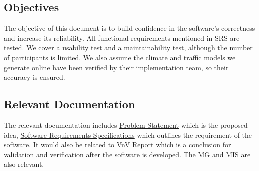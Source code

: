 \documentclass[12pt, titlepage]{article}
\begin{document}
\subsection{Objectives}
The objective of this document is to build confidence in the software's correctness and increase its reliability. All functional requirements mentioned in SRS are tested. We cover a usability test and a maintainability test, although the number of participants is limited. We also assume the climate and traffic models we generate online have been verified by their implementation team, so their accuracy is ensured. 





\subsection{Relevant Documentation}
The relevant documentation includes \href{https://smiths.github.io/BridgeChlorideExposurePredictor/ProblemStatementAndGoals/ProblemStatement.pdf}{Problem Statement} which is the proposed idea, \href{https://smiths.github.io/BridgeChlorideExposurePredictor/SRS/SRS.pdf}{Software Requirements Specifications} which outlines the requirement of the software. It would also be related to \href{https://smiths.github.io/BridgeChlorideExposurePredictor/VnVReport/VnVReport.pdf}{VnV Report} which is a conclusion for validation and verification after the software is developed. The \href{https://smiths.github.io/BridgeChlorideExposurePredictor/Design/SoftArchitecture/MG.pdf}{MG} and \href{https://smiths.github.io/BridgeChlorideExposurePredictor/Design/SoftDetailedDes/MIS.pdf}{MIS} are also relevant.
\end{document}
